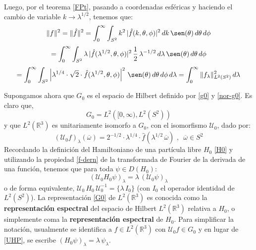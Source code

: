 \documentclass[12pt]{book}
\numberwithin{equation}{chapter}
\def\ol{\overline}
\def\R{\mathbb{R}}
\def\t{\theta}
\def\rar{\rightarrow}
\def\U{\mathcal{U}}
\begin{document}
Luego, por el teorema \ref{FPt}, pasando a coordenadas esf\'ericas y haciendo el cambio de variable $ k \rar \lambda^{1/2} $, tenemos que:
$$ \| f \|^{2} = \| \hat{f} \|^{2}= \int_{0}^{\infty} \int_{S^{2}} k^{2} \,| \hat{f}(k,\t,\phi) |^{2} \, dk \, \sen (\t) \, d\t \, d \phi $$
$$ = \int_{0}^{\infty} \int_{S^{2}} \lambda \, |\hat{f}( \lambda^{1/2} , \t , \phi ) |^{2} \, \frac{1}{2}\, \lambda^{-1/2} \, d \lambda \, \sen (\t) \, d \t \, d \phi $$
\begin{equation}\label{nor-g0}
= \int_{0}^{\infty} \int_{S^{2}} \left| \lambda^{1/4} \cdot \sqrt{2} \cdot \hat{f}(\lambda^{1/2},\t , \phi ) \right|^{2} \, \sen(\t) \, d\t \, d\phi \, d\lambda = \int_{0}^{\infty} \| f_{\lambda} \|_{L^{2}(S^{2})}^{2} \, d\lambda
\end{equation}

Supongamos ahora que $G_{0}$ es el espacio de Hilbert definido por \eqref{g0} y \eqref{nor-g0}. Es claro que,
\begin{equation}\label{G0}
G_{0}= L^{2} \left( [0 , \infty),L^{2}(S^{2}) \right)
\end{equation}
y que $L^{2}(\R^{3})$ es unitariamente isomorfo a $G_{0}$, con el isomorfismo $\U_{0}$, dado por:
\begin{equation}
( \U_{0} f )_{\lambda} (\ol{\omega})= 2^{-1/2} \cdot \lambda^{1/4} \cdot \hat{f} ( \lambda^{1/2} \, \ol{\omega} ) \,\,,\,\,\, \ol{\omega} \in S^{2}
\end{equation}
Recordando la definici\'on del Hamiltoniano de una part\'icula libre $H_{0}$ \eqref{H0} y utilizando la propiedad \eqref{f-dern} de la transformada de Fourier de la derivada de una funci\'on, tenemos que para toda $\psi \in D(H_{0})$:
\begin{equation}\label{UHP}
(\U_{0} H_{0} \psi )_{\lambda}= \lambda \, ( \U_{0} \psi )_{\lambda}
\end{equation}
o de forma equivalente, $ \U_{0} \, H_{0} \, \U_{0}^{-1}= \{ \lambda \, I_{0} \} $ (con $I_{0}$ el operador identidad de $L^{2}(S^{2})$). La representaci\'on \eqref{G0} de $L^{2}(\R^{3})$ es conocida como la {\bf representaci\'on espectral} del espacio de Hilbert $L^{2}(\R^{3})$ relativa a $H_{0}$, o simplemente coma la {\bf representaci\'on espectral} de $H_{0}$. Para simplificar la notaci\'on, usualmente se identifica a $f \in L^{2}(\R^{3})$ con $ \U_{0} f \in G_{0} $ y en lugar de \eqref{UHP}, se escribe $(H_{0} \psi)_{\lambda}= \lambda \, \psi_{\lambda} $.\\
\end{document}
